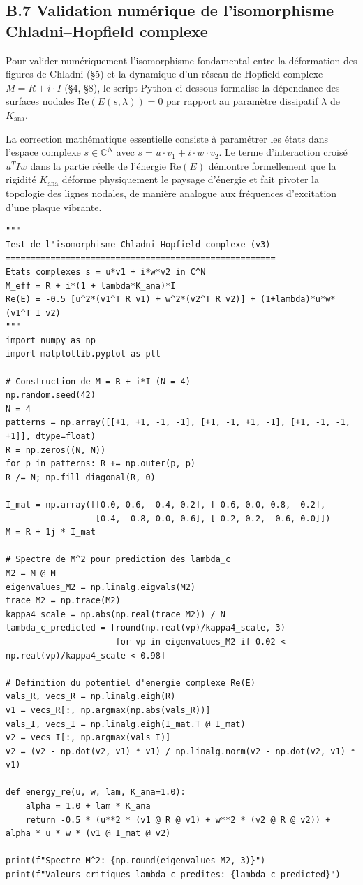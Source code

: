 \documentclass[french, 11pt, twoside, openright, a5paper]{book}
\begin{document}
\subsection*{B.7 Validation numérique de l'isomorphisme Chladni--Hopfield complexe}

Pour valider numériquement l'isomorphisme fondamental entre la déformation des figures de Chladni (§5) et la dynamique d'un réseau de Hopfield complexe $M = R + i \cdot I$ (§4, §8), le script Python ci-dessous formalise la dépendance des surfaces nodales $\text{Re}(E(s, \lambda)) = 0$ par rapport au paramètre dissipatif $\lambda$ de $K_{\text{ana}}$.

La correction mathématique essentielle consiste à paramétrer les états dans l'espace complexe $s \in \mathbb{C}^N$ avec $s = u \cdot v_1 + i \cdot w \cdot v_2$. Le terme d'interaction croisé $u^T I w$ dans la partie réelle de l'énergie $\text{Re}(E)$ démontre formellement que la rigidité $K_{\text{ana}}$ déforme physiquement le paysage d'énergie et fait pivoter la topologie des lignes nodales, de manière analogue aux fréquences d'excitation d'une plaque vibrante.

\begin{verbatim}
"""
Test de l'isomorphisme Chladni-Hopfield complexe (v3)
======================================================
Etats complexes s = u*v1 + i*w*v2 in C^N
M_eff = R + i*(1 + lambda*K_ana)*I
Re(E) = -0.5 [u^2*(v1^T R v1) + w^2*(v2^T R v2)] + (1+lambda)*u*w*(v1^T I v2)
"""
import numpy as np
import matplotlib.pyplot as plt

# Construction de M = R + i*I (N = 4)
np.random.seed(42)
N = 4
patterns = np.array([[+1, +1, -1, -1], [+1, -1, +1, -1], [+1, -1, -1, +1]], dtype=float)
R = np.zeros((N, N))
for p in patterns: R += np.outer(p, p)
R /= N; np.fill_diagonal(R, 0)

I_mat = np.array([[0.0, 0.6, -0.4, 0.2], [-0.6, 0.0, 0.8, -0.2],
                  [0.4, -0.8, 0.0, 0.6], [-0.2, 0.2, -0.6, 0.0]])
M = R + 1j * I_mat

# Spectre de M^2 pour prediction des lambda_c
M2 = M @ M
eigenvalues_M2 = np.linalg.eigvals(M2)
trace_M2 = np.trace(M2)
kappa4_scale = np.abs(np.real(trace_M2)) / N
lambda_c_predicted = [round(np.real(vp)/kappa4_scale, 3) 
                      for vp in eigenvalues_M2 if 0.02 < np.real(vp)/kappa4_scale < 0.98]

# Definition du potentiel d'energie complexe Re(E)
vals_R, vecs_R = np.linalg.eigh(R)
v1 = vecs_R[:, np.argmax(np.abs(vals_R))]
vals_I, vecs_I = np.linalg.eigh(I_mat.T @ I_mat)
v2 = vecs_I[:, np.argmax(vals_I)]
v2 = (v2 - np.dot(v2, v1) * v1) / np.linalg.norm(v2 - np.dot(v2, v1) * v1)

def energy_re(u, w, lam, K_ana=1.0):
    alpha = 1.0 + lam * K_ana
    return -0.5 * (u**2 * (v1 @ R @ v1) + w**2 * (v2 @ R @ v2)) + alpha * u * w * (v1 @ I_mat @ v2)

print(f"Spectre M^2: {np.round(eigenvalues_M2, 3)}")
print(f"Valeurs critiques lambda_c predites: {lambda_c_predicted}")
\end{verbatim}
\end{document}
